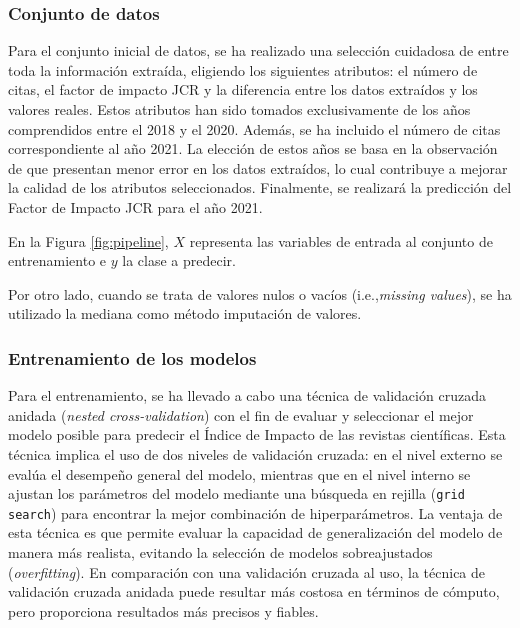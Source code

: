 \subsubsection{Conjunto de datos}
Para el conjunto inicial de datos, se ha realizado una selección cuidadosa de entre toda la información extraída, eligiendo los siguientes atributos: el número de citas, el factor de impacto JCR y la diferencia entre los datos extraídos y los valores reales. Estos atributos han sido tomados exclusivamente de los años comprendidos entre el 2018 y el 2020. Además, se ha incluido el número de citas correspondiente al año 2021. La elección de estos años se basa en la observación de que presentan menor error en los datos extraídos, lo cual contribuye a mejorar la calidad de los atributos seleccionados. Finalmente, se realizará la predicción del Factor de Impacto JCR para el año 2021.


En la Figura \ref{fig:pipeline}, $X$ representa las variables de entrada al conjunto de entrenamiento e $y$ la clase a predecir.

Por otro lado, cuando se trata de valores nulos o vacíos (i.e.,\textit{missing values}), se ha utilizado la mediana como método imputación de valores.

\subsubsection{Entrenamiento de los modelos}
Para el entrenamiento, se ha llevado a cabo una técnica de validación cruzada anidada (\textit{nested cross-validation}) con el fin de evaluar y seleccionar el mejor modelo posible para predecir el Índice de Impacto de las revistas científicas. Esta técnica implica el uso de dos niveles de validación cruzada: en el nivel externo se evalúa el desempeño general del modelo, mientras que en el nivel interno se ajustan los parámetros del modelo mediante una búsqueda en rejilla (\texttt{grid search}) para encontrar la mejor combinación de hiperparámetros. La ventaja de esta técnica es que permite evaluar la capacidad de generalización del modelo de manera más realista, evitando la selección de modelos sobreajustados (\textit{overfitting}). En comparación con una validación cruzada al uso, la técnica de validación cruzada anidada puede resultar más costosa en términos de cómputo, pero proporciona resultados más precisos y fiables.


